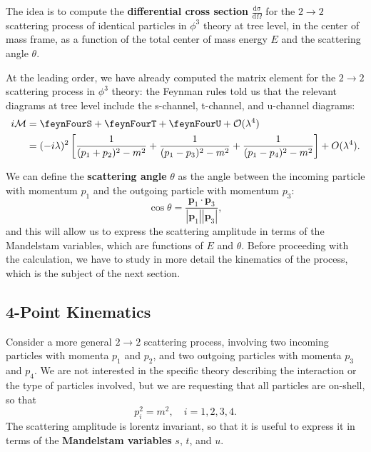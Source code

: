 \begin{example}
    The idea is to compute the \textbf{differential cross section} \(\tfrac{\mathrm{d\sigma}}{\mathrm{d} \Omega}\) for the \(2 \to 2\) scattering process of identical particles in \(\phi^3\) theory at tree level, in the center of mass frame, as a function of the total center of mass energy \(E\) and the scattering angle \(\theta\).

    At the leading order, we have already computed the matrix element for the \(2 \to 2\) scattering process in \(\phi^3\) theory: the Feynman rules told us that the relevant diagrams at tree level include the s-channel, t-channel, and u-channel diagrams:
    \[
        \begin{aligned}
            i \mathcal{M} & = \feynFourS + \feynFourT + \feynFourU + \mathcal{O}(\lambda^4)                                                                               \\
                          & = (-i \lambda)^2 \left[ \frac{1}{(p_1 + p_2)^2 - m^2} + \frac{1}{(p_1 - p_3)^2 - m^2} + \frac{1}{(p_1 - p_4)^2 - m^2} \right] + O(\lambda^4).
        \end{aligned}
    \]

    We can define the \textbf{scattering angle} \(\theta\) as the angle between the incoming particle with momentum \(p_1\) and the outgoing particle with momentum \(p_3\):
    \[
        \cos \theta = \frac{\mathbf{p}_1 \cdot \mathbf{p}_3}{|\mathbf{p}_1||\mathbf{p}_3|},
    \]
    and this will allow us to express the scattering amplitude in terms of the Mandelstam variables, which are functions of \(E\) and \(\theta\). Before proceeding with the calculation, we have to study in more detail the kinematics of the process, which is the subject of the next section.
\end{example}

\subsection{4-Point Kinematics}

Consider a more general \(2 \to 2\) scattering process, involving two incoming particles with momenta \(p_1\) and \(p_2\), and two outgoing particles with momenta \(p_3\) and \(p_4\). We are not interested in the specific theory describing the interaction or the type of particles involved, but we are requesting that all particles are on-shell, so that
\[
    p_i^2 = m^2, \quad i = 1, 2, 3, 4.
\]
The scattering amplitude is lorentz invariant, so that it is useful to express it in terms of the \textbf{Mandelstam variables} \(s\), \(t\), and \(u\).

